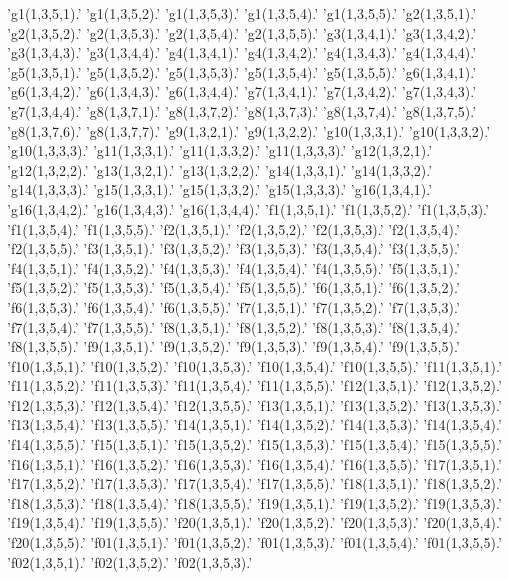 'g1(1,3,5,1).'
'g1(1,3,5,2).'
'g1(1,3,5,3).'
'g1(1,3,5,4).'
'g1(1,3,5,5).'
'g2(1,3,5,1).'
'g2(1,3,5,2).'
'g2(1,3,5,3).'
'g2(1,3,5,4).'
'g2(1,3,5,5).'
'g3(1,3,4,1).'
'g3(1,3,4,2).'
'g3(1,3,4,3).'
'g3(1,3,4,4).'
'g4(1,3,4,1).'
'g4(1,3,4,2).'
'g4(1,3,4,3).'
'g4(1,3,4,4).'
'g5(1,3,5,1).'
'g5(1,3,5,2).'
'g5(1,3,5,3).'
'g5(1,3,5,4).'
'g5(1,3,5,5).'
'g6(1,3,4,1).'
'g6(1,3,4,2).'
'g6(1,3,4,3).'
'g6(1,3,4,4).'
'g7(1,3,4,1).'
'g7(1,3,4,2).'
'g7(1,3,4,3).'
'g7(1,3,4,4).'
'g8(1,3,7,1).'
'g8(1,3,7,2).'
'g8(1,3,7,3).'
'g8(1,3,7,4).'
'g8(1,3,7,5).'
'g8(1,3,7,6).'
'g8(1,3,7,7).'
'g9(1,3,2,1).'
'g9(1,3,2,2).'
'g10(1,3,3,1).'
'g10(1,3,3,2).'
'g10(1,3,3,3).'
'g11(1,3,3,1).'
'g11(1,3,3,2).'
'g11(1,3,3,3).'
'g12(1,3,2,1).'
'g12(1,3,2,2).'
'g13(1,3,2,1).'
'g13(1,3,2,2).'
'g14(1,3,3,1).'
'g14(1,3,3,2).'
'g14(1,3,3,3).'
'g15(1,3,3,1).'
'g15(1,3,3,2).'
'g15(1,3,3,3).'
'g16(1,3,4,1).'
'g16(1,3,4,2).'
'g16(1,3,4,3).'
'g16(1,3,4,4).'
'f1(1,3,5,1).'
'f1(1,3,5,2).'
'f1(1,3,5,3).'
'f1(1,3,5,4).'
'f1(1,3,5,5).'
'f2(1,3,5,1).'
'f2(1,3,5,2).'
'f2(1,3,5,3).'
'f2(1,3,5,4).'
'f2(1,3,5,5).'
'f3(1,3,5,1).'
'f3(1,3,5,2).'
'f3(1,3,5,3).'
'f3(1,3,5,4).'
'f3(1,3,5,5).'
'f4(1,3,5,1).'
'f4(1,3,5,2).'
'f4(1,3,5,3).'
'f4(1,3,5,4).'
'f4(1,3,5,5).'
'f5(1,3,5,1).'
'f5(1,3,5,2).'
'f5(1,3,5,3).'
'f5(1,3,5,4).'
'f5(1,3,5,5).'
'f6(1,3,5,1).'
'f6(1,3,5,2).'
'f6(1,3,5,3).'
'f6(1,3,5,4).'
'f6(1,3,5,5).'
'f7(1,3,5,1).'
'f7(1,3,5,2).'
'f7(1,3,5,3).'
'f7(1,3,5,4).'
'f7(1,3,5,5).'
'f8(1,3,5,1).'
'f8(1,3,5,2).'
'f8(1,3,5,3).'
'f8(1,3,5,4).'
'f8(1,3,5,5).'
'f9(1,3,5,1).'
'f9(1,3,5,2).'
'f9(1,3,5,3).'
'f9(1,3,5,4).'
'f9(1,3,5,5).'
'f10(1,3,5,1).'
'f10(1,3,5,2).'
'f10(1,3,5,3).'
'f10(1,3,5,4).'
'f10(1,3,5,5).'
'f11(1,3,5,1).'
'f11(1,3,5,2).'
'f11(1,3,5,3).'
'f11(1,3,5,4).'
'f11(1,3,5,5).'
'f12(1,3,5,1).'
'f12(1,3,5,2).'
'f12(1,3,5,3).'
'f12(1,3,5,4).'
'f12(1,3,5,5).'
'f13(1,3,5,1).'
'f13(1,3,5,2).'
'f13(1,3,5,3).'
'f13(1,3,5,4).'
'f13(1,3,5,5).'
'f14(1,3,5,1).'
'f14(1,3,5,2).'
'f14(1,3,5,3).'
'f14(1,3,5,4).'
'f14(1,3,5,5).'
'f15(1,3,5,1).'
'f15(1,3,5,2).'
'f15(1,3,5,3).'
'f15(1,3,5,4).'
'f15(1,3,5,5).'
'f16(1,3,5,1).'
'f16(1,3,5,2).'
'f16(1,3,5,3).'
'f16(1,3,5,4).'
'f16(1,3,5,5).'
'f17(1,3,5,1).'
'f17(1,3,5,2).'
'f17(1,3,5,3).'
'f17(1,3,5,4).'
'f17(1,3,5,5).'
'f18(1,3,5,1).'
'f18(1,3,5,2).'
'f18(1,3,5,3).'
'f18(1,3,5,4).'
'f18(1,3,5,5).'
'f19(1,3,5,1).'
'f19(1,3,5,2).'
'f19(1,3,5,3).'
'f19(1,3,5,4).'
'f19(1,3,5,5).'
'f20(1,3,5,1).'
'f20(1,3,5,2).'
'f20(1,3,5,3).'
'f20(1,3,5,4).'
'f20(1,3,5,5).'
'f01(1,3,5,1).'
'f01(1,3,5,2).'
'f01(1,3,5,3).'
'f01(1,3,5,4).'
'f01(1,3,5,5).'
'f02(1,3,5,1).'
'f02(1,3,5,2).'
'f02(1,3,5,3).'
